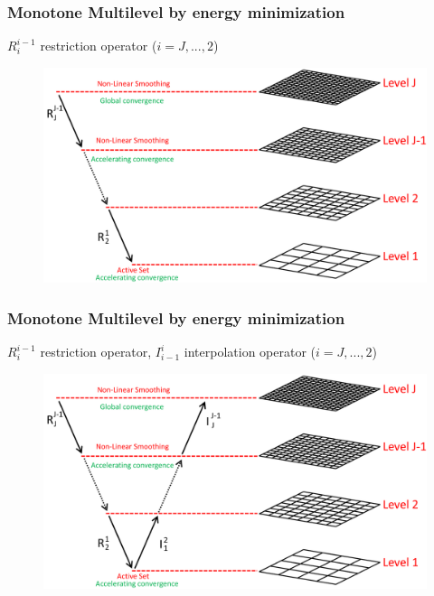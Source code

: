 \documentclass[8pt, oneside]{beamer}   	%
\newcommand{\titlecolor}[1]{\frametitle{\textcolor{dkgrey}{ \textbf{#1}}}}
\begin{document}
\begin{frame}
\titlecolor{Monotone Multilevel by energy minimization}
$R_{i}^{i-1}$ restriction operator ($ i=J,...,2 $)
\begin{figure}[htbp!]
		\centering
	\includegraphics[width=1\textwidth]{img/multigridexplained3.pdf}
\end{figure}
\end{frame}
\begin{frame}
\titlecolor{Monotone Multilevel by energy minimization}
$R_{i}^{i-1}$ restriction operator, $I_{i-1}^{i}$ interpolation operator ($ i=J,...,2 $)
\begin{figure}[htbp!]
		\centering
	\includegraphics[width=1\textwidth]{img/multigridexplained4.pdf}
\end{figure}
\end{frame}
\end{document}
